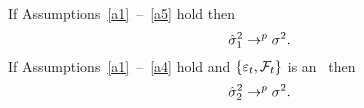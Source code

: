If Assumptions~\ref{a1}~--~\ref{a5} hold then
\begin{equation*}
  \hat\sigma_1^2 \to^p \sigma^2.
\end{equation*}
If Assumptions~\ref{a1}~--~\ref{a4} hold and $\{\varepsilon_{t},
\mathcal{F}_t\}$ is an \mds\ then
\begin{equation*}
   \hat\sigma_2^2 \to^p \sigma^2.
\end{equation*}
